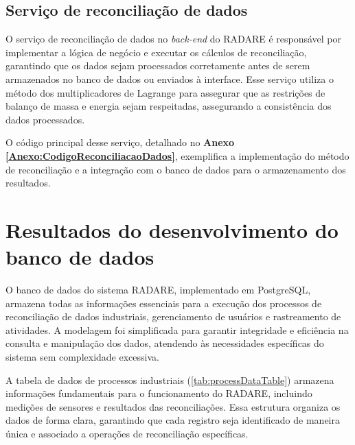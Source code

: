 \subsection{Serviço de reconciliação de dados}

O serviço de reconciliação de dados no \textit{back-end} do RADARE é responsável por implementar a lógica de negócio e executar os cálculos de reconciliação, garantindo que os dados sejam processados corretamente antes de serem armazenados no banco de dados ou enviados à interface. Esse serviço utiliza o método dos multiplicadores de Lagrange para assegurar que as restrições de balanço de massa e energia sejam respeitadas, assegurando a consistência dos dados processados.

O código principal desse serviço, detalhado no \textbf{Anexo \ref{Anexo:CodigoReconciliacaoDados}}, exemplifica a implementação do método de reconciliação e a integração com o banco de dados para o armazenamento dos resultados.

\section{Resultados do desenvolvimento do banco de dados}

O banco de dados do sistema RADARE, implementado em PostgreSQL, armazena todas as informações essenciais para a execução dos processos de reconciliação de dados industriais, gerenciamento de usuários e rastreamento de atividades. A modelagem foi simplificada para garantir integridade e eficiência na consulta e manipulação dos dados, atendendo às necessidades específicas do sistema sem complexidade excessiva.

A tabela de dados de processos industriais (\autoref{tab:processDataTable}) armazena informações fundamentais para o funcionamento do RADARE, incluindo medições de sensores e resultados das reconciliações. Essa estrutura organiza os dados de forma clara, garantindo que cada registro seja identificado de maneira única e associado a operações de reconciliação específicas.

